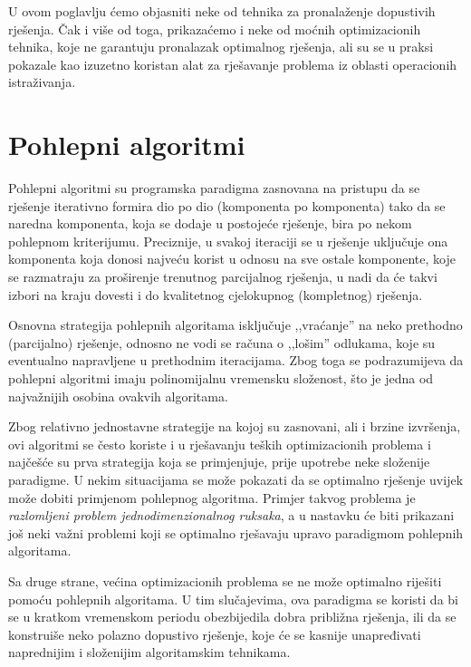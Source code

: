 \documentclass[b5paper, utf8, 11pt, colorlinks]{book}
\theoremstyle{definition}
\begin{document}
 U ovom poglavlju ćemo objasniti neke od tehnika za pronalaženje dopustivih rješenja. Čak i više od toga, prikazaćemo i neke od moćnih optimizacionih tehnika, koje ne garantuju  pronalazak optimalnog rješenja, ali su se u praksi pokazale kao izuzetno koristan alat za rješavanje problema iz oblasti operacionih istraživanja.
 

\section{Pohlepni algoritmi}
 
Pohlepni algoritmi su programska paradigma zasnovana na pristupu da se  rješenje iterativno formira dio po dio (komponenta po komponenta) tako da se naredna komponenta, koja se dodaje u postojeće rješenje, bira 
 po nekom pohlepnom kriterijumu. Preciznije, u svakoj iteraciji se u rješenje uključuje ona komponenta koja donosi najveću korist u odnosu na sve ostale komponente, koje se razmatraju za proširenje  trenutnog parcijalnog rješenja, u nadi da će takvi izbori na kraju dovesti i do kvalitetnog cjelokupnog (kompletnog) rješenja.
 
 
 Osnovna strategija pohlepnih algoritama isključuje ,,vraćanje'' na neko prethodno (parcijalno) rješenje, odnosno ne vodi se računa o ,,lošim'' odlukama, koje su eventualno napravljene u prethodnim iteracijama. Zbog toga se podrazumijeva da pohlepni algoritmi imaju polinomijalnu vremensku složenost, što je jedna od najvažnijih osobina ovakvih algoritama.
 
 Zbog relativno jednostavne strategije na kojoj su zasnovani, ali i brzine izvršenja, ovi algoritmi se često koriste i u rješavanju teških optimizacionih problema i najčešće su prva strategija koja se primjenjuje, prije 
upotrebe neke složenije paradigme. 
U nekim situacijama se može pokazati da se optimalno rješenje uvijek može dobiti primjenom pohlepnog algoritma. Primjer takvog problema je \emph{razlomljeni problem jednodimenzionalnog ruksaka}, a u nastavku će biti prikazani još neki važni problemi koji se optimalno rješavaju upravo paradigmom pohlepnih algoritama.

Sa druge strane, većina optimizacionih problema se ne može optimalno riješiti pomoću pohlepnih algoritama. U tim slučajevima, ova paradigma se koristi da bi se u kratkom vremenskom periodu obezbijedila dobra približna rješenja, ili da se konstruiše neko polazno dopustivo rješenje, koje će se kasnije unapređivati naprednijim i složenijim algoritamskim tehnikama. 
\end{document}
